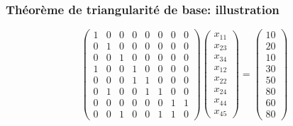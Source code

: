 \documentclass[usepdftitle=false]{beamer}
\begin{document}
\begin{frame}
\frametitle{Théorème de triangularité de base: illustration}

\[
\begin{pmatrix}
 1 & 0 & 0 & 0 & 0 & 0 & 0 & 0 \\
 0 & 1 & 0 & 0 & 0 & 0 & 0 & 0 \\
 0 & 0 & 1 & 0 & 0 & 0 & 0 & 0 \\
 1 & 0 & 0 & 1 & 0 & 0 & 0 & 0 \\
 0 & 0 & 0 & 1 & 1 & 0 & 0 & 0 \\
 0 & 1 & 0 & 0 & 1 & 1 & 0 & 0 \\
 0 & 0 & 0 & 0 & 0 & 0 & 1 & 1 \\
 0 & 0 & 1 & 0 & 0 & 1 & 1 & 0
\end{pmatrix}
\begin{pmatrix}
x_{11} \\
x_{23} \\
x_{34} \\
x_{12} \\
x_{22} \\
x_{24} \\
x_{44} \\
x_{45}
\end{pmatrix}
=
\begin{pmatrix}
10 \\
20 \\
10 \\
30 \\
50 \\
80 \\
60 \\
80
\end{pmatrix}
\]

\end{frame}
\end{document}
